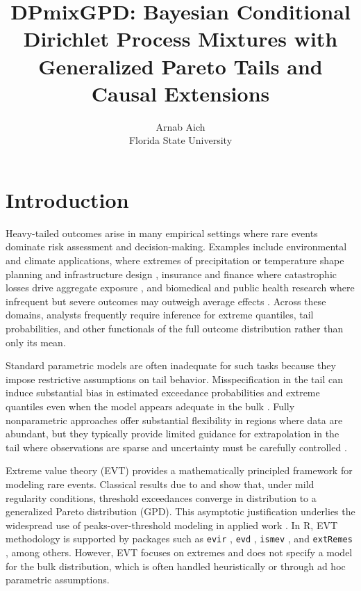 \documentclass[article]{jss}\usepackage[]{graphicx}\usepackage[]{xcolor}
\author{Arnab Aich\\Florida State University}
\title{DPmixGPD: Bayesian Conditional Dirichlet Process Mixtures with Generalized Pareto Tails and Causal Extensions}
\begin{document}
\maketitle

\section{Introduction}
Heavy-tailed outcomes arise in many empirical settings where rare events dominate risk assessment and decision-making.
Examples include environmental and climate applications, where extremes of precipitation or temperature shape planning and infrastructure design \citep{Coles2001,Katz2002,DavisonSmith1990}, insurance and finance where catastrophic losses drive aggregate exposure \citep{Embrechts1997}, and biomedical and public health research where infrequent but severe outcomes may outweigh average effects \citep{AustinSchuster2016}.
Across these domains, analysts frequently require inference for extreme quantiles, tail probabilities, and other functionals of the full outcome distribution rather than only its mean.

Standard parametric models are often inadequate for such tasks because they impose restrictive assumptions on tail behavior.
Misspecification in the tail can induce substantial bias in estimated exceedance probabilities and extreme quantiles even when the model appears adequate in the bulk \citep{Coles2001,DavisonSmith1990}.
Fully nonparametric approaches offer substantial flexibility in regions where data are abundant, but they typically provide limited guidance for extrapolation in the tail where observations are sparse and uncertainty must be carefully controlled \citep{GhosalVanDerVaart2017}.

Extreme value theory (EVT) provides a mathematically principled framework for modeling rare events.
Classical results due to \citet{BalkemaDeHaan1974} and \citet{Pickands1975} show that, under mild regularity conditions, threshold exceedances converge in distribution to a generalized Pareto distribution (GPD).
This asymptotic justification underlies the widespread use of peaks-over-threshold modeling in applied work \citep{DavisonSmith1990,Coles2001,DeHaanFerreira2007}.
In \textsf{R}, EVT methodology is supported by packages such as \texttt{evir} \citep{evirPkg}, \texttt{evd} \citep{Stephenson2002}, \texttt{ismev} \citep{ismevPkg}, and \texttt{extRemes} \citep{GillelandKatz2016}, among others.
However, EVT focuses on extremes and does not specify a model for the bulk distribution, which is often handled heuristically or through ad hoc parametric assumptions.
\end{document}
